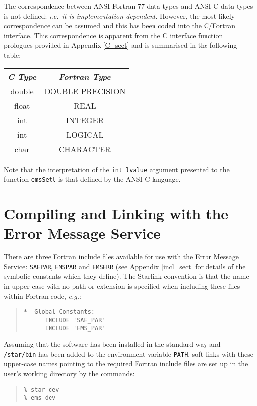 \documentclass[twoside,11pt]{article}
\newcommand{\xlabel}[1]{}
\renewcommand{\_}{\texttt{\symbol{95}}}
\begin{document}
The correspondence between ANSI Fortran 77 data types and ANSI C data types
is not defined: \textit{i.e.\ it is implementation dependent}.
However, the most likely correspondence can be assumed and this has been coded
into the C/Fortran interface.
This correspondence is apparent from the C interface function prologues
provided in Appendix \ref{C_sect} and is summarised in the following table:

\begin {center}
\begin {tabular}{||c|c||}
\hline
\textit{C Type} & \textit{Fortran Type}\\
\hline
double & DOUBLE PRECISION\\
float & REAL\\
int & INTEGER\\
int & LOGICAL\\
char & CHARACTER\\
\hline
\end {tabular}
\end {center}

Note that the interpretation of the \texttt{int lvalue} argument presented to 
the function \texttt{emsSetl} is that defined by the ANSI C language.

\section{\xlabel{compiling_and_linking_with_the_error_message_service}Compiling
and Linking with the Error Message Service}\label{comp_sect}
There are three Fortran include files available for use with the Error Message 
Service: \texttt{SAE\_PAR}, \texttt{EMS\_PAR} and \texttt{EMS\_ERR}
(see Appendix \ref{incl_sect} for details of the symbolic constants which they 
define).
The Starlink convention
is that the name in upper case with no path or extension is specified when 
including these files within Fortran code, 
\textit{e.g.}:
\begin{quote}
\begin{verbatim}
*  Global Constants:
      INCLUDE 'SAE_PAR'
      INCLUDE 'EMS_PAR'
\end{verbatim}
\end{quote}

Assuming that the software has been installed in the standard way and
\texttt{/star/bin} has been added to the environment variable
\texttt{PATH}, soft links with these upper-case names pointing to the required 
Fortran include files are set up in the user's working directory by the
commands:
\begin {quote}
\begin{verbatim}
% star_dev
% ems_dev
\end{verbatim}
\end {quote}
\end{document}
